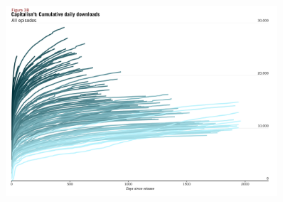 \documentclass[11pt, letterpaper, twoside]{article}
\begin{document}
\begin{figure}[!htb]
  \centering
  \includegraphics[width=0.9\textwidth]{figures/alltime_episodes_cumul_perf.png}
  \caption{}
  \label{appendix:alltime_cumul_perf}
\end{figure}

\begin{landscape}
  
\end{landscape}
\end{document}
